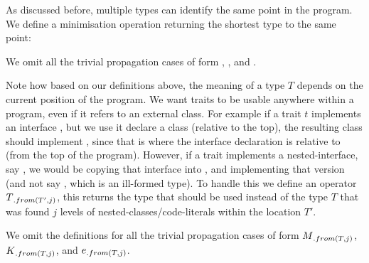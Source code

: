 
As discussed before, multiple types can identify the same point in the program.
We define a minimisation operation returning the shortest type to the same point:

\begin{defs}
\end{defs}
We omit all the trivial propagation cases of form , ,  and .

Note how based on our definitions above, the meaning of a type $T$ depends on the current position of the program. We want traits to be usable anywhere within a program, even if it refers to an external class. For example if a trait $t$ implements an interface , but we use it declare a class  (relative to the top), the resulting class should implement , since that is where the interface declaration is relative to  (from the top of the program). However, if a trait implements a nested-interface, say , we would be copying that interface into , and implementing that version (and not say , which is an ill-formed type). To handle this we define an operator $T{{}_{.{from}({T',j})}}$, this returns the type that should be used instead of the type $T$ that was found $j$ levels of nested-classes/code-literals within the location $T'$.

We omit the definitions for all the trivial propagation cases of form $M{{}_{.{from}({T,j})}}$, $K{{}_{.{from}({T,j})}}$, and $e{{}_{.{from}({T,j})}}$.

\begin{defs}
	
	
\end{defs}

